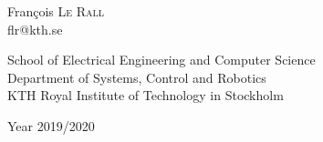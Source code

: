 \vspace{1ex}

\begin{center}
      {\large François \textsc{Le Rall}} \\
      flr@kth.se
  \end{center}

  \begin{center}
    \vfill
    School of Electrical Engineering and Computer Science \\
    Department of Systems, Control and Robotics \\
    KTH Royal Institute of Technology in Stockholm
  \end{center}


\begin{center}
  \vfill
  Year 2019/2020 \hfill
\end{center}
